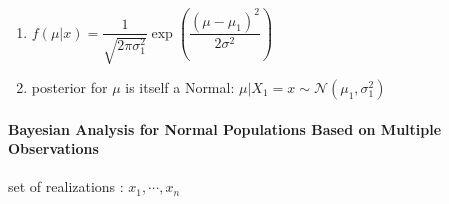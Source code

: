 \begin{enumerate}[itemsep=0.2cm]
\begin{enumerate}[itemsep=0.2cm]
        \item $
            f(\mu|x) 
            = \dfrac{1}{\sqrt{2\pi\sigma_1^2}} \exp\left(
                \dfrac{(\mu - \mu_1)^2}{2\sigma^2}
            \right)
        $

        \item posterior for $\mu$ is itself a Normal: $\mu|X_1 = x \sim \mathcal{N} (\mu_1, \sigma_1^2)$
    \end{enumerate}

\end{enumerate}

\paragraph{Bayesian Analysis for Normal Populations Based on Multiple Observations \cite{ism-1}} \label{Bayesian Analysis for Normal Populations Based on Multiple Observations}

set of realizations : $x_1, \cdots, x_n$

